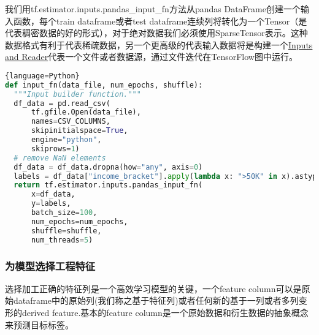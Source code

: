 我们用tf.estimator.inputs.pandas\_input\_fn方法从pandas DataFrame创建一个输入函数，每个train dataframe或者test dataframe连续列将转化为一个Tensor（是代表稠密数据的好的形式），对于绝对数据我们必须使用SparseTensor表示。这种数据格式有利于代表稀疏数据，另一个更高级的代表输入数据将是构建一个\href{https://www.tensorflow.org/api_guides/python/io_ops#inputs_and_readers}{Inputs and Reader}代表一个文件或者数据源，通过文件迭代在TensorFlow图中运行。
\begin{lstlisting}[language=Python]{language=Python}
def input_fn(data_file, num_epochs, shuffle):
  """Input builder function."""
  df_data = pd.read_csv(
      tf.gfile.Open(data_file),
      names=CSV_COLUMNS,
      skipinitialspace=True,
      engine="python",
      skiprows=1)
  # remove NaN elements
  df_data = df_data.dropna(how="any", axis=0)
  labels = df_data["income_bracket"].apply(lambda x: ">50K" in x).astype(int)
  return tf.estimator.inputs.pandas_input_fn(
      x=df_data,
      y=labels,
      batch_size=100,
      num_epochs=num_epochs,
      shuffle=shuffle,
      num_threads=5)
\end{lstlisting}
\subsubsection{为模型选择工程特征}
选择加工正确的特征列是一个高效学习模型的关键，一个feature column可以是原始dataframe中的原始列(我们称之基于特征列)或者任何新的基于一列或者多列变形的derived feature.基本的feature column是一个原始数据和衍生数据的抽象概念来预测目标标签。
